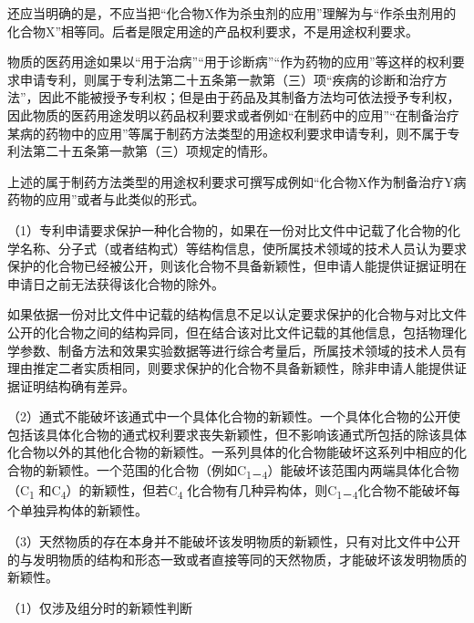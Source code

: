 还应当明确的是，不应当把“化合物X作为杀虫剂的应用”理解为与“作杀虫剂用的化合物X”相等同。后者是限定用途的产品权利要求，不是用途权利要求。

物质的医药用途如果以“用于治病”“用于诊断病”“作为药物的应用”等这样的权利要求申请专利，则属于专利法第二十五条第一款第（三）项“疾病的诊断和治疗方法”，因此不能被授予专利权；但是由于药品及其制备方法均可依法授予专利权，因此物质的医药用途发明以药品权利要求或者例如“在制药中的应用”“在制备治疗某病的药物中的应用”等属于制药方法类型的用途权利要求申请专利，则不属于专利法第二十五条第一款第（三）项规定的情形。

上述的属于制药方法类型的用途权利要求可撰写成例如“化合物X作为制备治疗Y病药物的应用”或者与此类似的形式。

{\setlength{\parindent}{17.1bp}（1）专利申请要求保护一种化合物的，如果在一份对比文件中记载了化合物的化学名称、分子式（或者结构式）等结构信息，使所属技术领域的技术人员认为要求保护的化合物已经被公开，则该化合物不具备新颖性，但申请人能提供证据证明在申请日之前无法获得该化合物的除外。\par}

如果依据一份对比文件中记载的结构信息不足以认定要求保护的化合物与对比文件公开的化合物之间的结构异同，但在结合该对比文件记载的其他信息，包括物理化学参数、制备方法和效果实验数据等进行综合考量后，所属技术领域的技术人员有理由推定二者实质相同，则要求保护的化合物不具备新颖性，除非申请人能提供证据证明结构确有差异。

{\setlength{\parindent}{17.1bp}（2）通式不能破坏该通式中一个具体化合物的新颖性。一个具体化合物的公开使包括该具体化合物的通式权利要求丧失新颖性，但不影响该通式所包括的除该具体化合物以外的其他化合物的新颖性。一系列具体的化合物能破坏这系列中相应的化合物的新颖性。一个范围的化合物（例如C\textsubscript{1－4}）能破坏该范围内两端具体化合物（C\textsubscript{1} 和C\textsubscript{4}）的新颖性，但若C\textsubscript{4} 化合物有几种异构体，则C\textsubscript{1－4}化合物不能破坏每个单独异构体的新颖性。\par}

{\setlength{\parindent}{17.1bp}（3）天然物质的存在本身并不能破坏该发明物质的新颖性，只有对比文件中公开的与发明物质的结构和形态一致或者直接等同的天然物质，才能破坏该发明物质的新颖性。\par}

{\setlength{\parindent}{17.1bp}（1）仅涉及组分时的新颖性判断\par}

